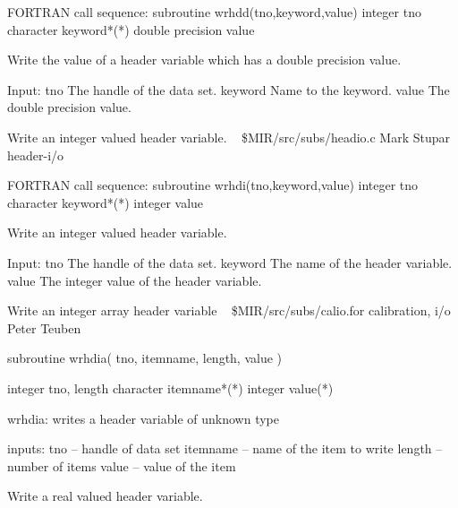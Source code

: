 \par{\tenpoint
{\eightpoint\begintt
FORTRAN call sequence:
        subroutine wrhdd(tno,keyword,value)
        integer tno
        character keyword*(*)
        double precision value

  Write the value of a header variable which has a double precision value.

  Input:
    tno         The handle of the data set.
    keyword     Name to the keyword.
    value       The double precision value.                             
\endtt}
\par}
%
\noindent Write an integer valued header variable.
\newline \ 
\newline {} \$MIR/src/subs/headio.c
\newline {} Mark Stupar
\newline {} header-i/o
\par{\tenpoint
{\eightpoint\begintt
FORTRAN call sequence:
        subroutine wrhdi(tno,keyword,value)
        integer tno
        character keyword*(*)
        integer value

  Write an integer valued header variable.

  Input:
    tno         The handle of the data set.
    keyword     The name of the header variable.
    value       The integer value of the header variable.               
\endtt}
\par}
%
\noindent Write an integer array header variable
\newline \ 
\newline {} \$MIR/src/subs/calio.for
\newline {} calibration, i/o
\newline \abox{Responsible:} Peter Teuben
\par{\tenpoint
{\eightpoint\begintt
        subroutine wrhdia( tno, itemname, length, value )

        integer tno, length
        character itemname*(*)
        integer   value(*)

   wrhdia:  writes a header variable of unknown type

   inputs:
       tno               -- handle of data set
       itemname          -- name of the item to write
       length            -- number of items
       value             -- value of the item
\endtt}
\par}
%
\noindent Write a real valued header variable.

